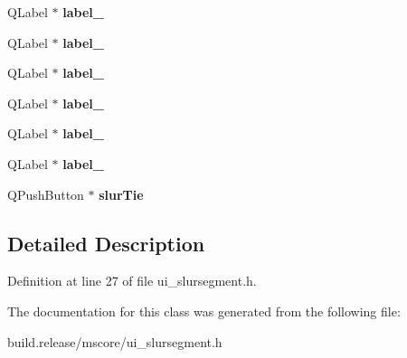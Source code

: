 \begin{DoxyCompactItemize}
\item 
\mbox{\label{class_ui___slur_segment_ac8cf88fe42dab73ca653389ebba1016f}} 
Q\+Label $\ast$ {\bfseries label\+\_}
\item 
\mbox{\label{class_ui___slur_segment_af1ec394cdd24350db533a49ed5189901}} 
Q\+Label $\ast$ {\bfseries label\+\_}
\item 
\mbox{\label{class_ui___slur_segment_aea5f34adfec87892b8519914124dbe1b}} 
Q\+Label $\ast$ {\bfseries label\+\_}
\item 
\mbox{\label{class_ui___slur_segment_ab2d89393459b290b59991a113748127c}} 
Q\+Label $\ast$ {\bfseries label\+\_}
\item 
\mbox{\label{class_ui___slur_segment_a4941bb244159140f4c79cee0aff9bf8e}} 
Q\+Label $\ast$ {\bfseries label\+\_}
\item 
\mbox{\label{class_ui___slur_segment_adde6e55f99b0c37bb9327e95522aa8ce}} 
Q\+Label $\ast$ {\bfseries label\+\_}
\item 
\mbox{\label{class_ui___slur_segment_ab0aa5c39258c839faa60c563276fbedc}} 
Q\+Push\+Button $\ast$ {\bfseries slur\+Tie}
\end{DoxyCompactItemize}


\subsection{Detailed Description}


Definition at line 27 of file ui\+\_\+slursegment.\+h.



The documentation for this class was generated from the following file\+:\begin{DoxyCompactItemize}
\item 
build.\+release/mscore/ui\+\_\+slursegment.\+h\end{DoxyCompactItemize}
